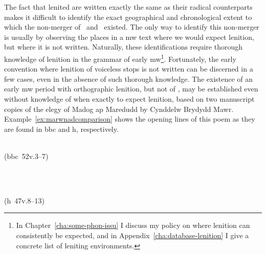 The fact that lenited  are written exactly the same as their radical counterparts makes it difficult to identify the exact geographical and chronological extent to which the non-merger of \xD\ and \lT\ existed. The only way to identify this non-merger is usually by observing the places in a \gls{mw} text where we would expect lenition, but where it is not written. Naturally, these identifications require thorough knowledge of lenition in  the grammar of early \gls{mw}\footnote{In Chapter~\ref{cha:some-phon-issu} I discuss my policy on where lenition can consistently be expected, and in Appendix~\ref{cha:database-lenition} I give a concrete list of leniting environments.}. Fortunately, the early convention where lenition of voiceless stops is not written can be discerned in a few cases, even in the absence of such thorough knowledge. The existence of an early \gls{mw} period with orthographic lenition, but  not of \lT, may be established even without knowledge of when exactly to expect lenition, based on two manuscript copies of the elegy of Madog ap Maredudd  by Cynddelw Brydydd Mawr. Example~\ref{ex:marwnadcomparison} shows the opening lines of this poem as they are found in \gls{bbc}  and \gls{h}, respectively.
\begin{mwl}
\item%
  \begin{minipage}[t]{0.45\textwidth}
    \\
    (\acrshort{bbc}~52v.3--7)
  \end{minipage}~
  \begin{minipage}[t]{0.45\textwidth}
    \\
    (\acrshort{h}~47v.8--13)
  \end{minipage}
  \label{ex:marwnadcomparison}
\end{mwl}
